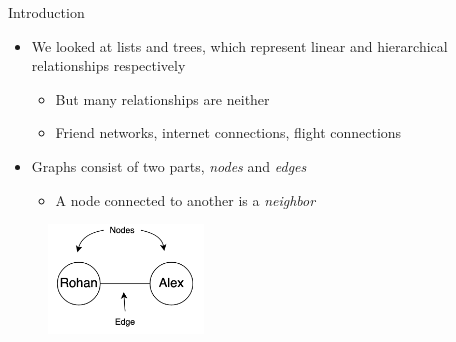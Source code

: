 \documentclass[
  ignorenonframetext,
]{beamer}
\providecommand{\tightlist}{%
  \setlength{\itemsep}{0pt}\setlength{\parskip}{0pt}}\usepackage{longtable,booktabs,array}
\begin{document}
\begin{frame}{Introduction}
\protect\hypertarget{introduction}{}
\begin{itemize}
\item
  We looked at lists and trees, which represent linear and hierarchical
  relationships respectively

  \begin{itemize}
  \item
    But many relationships are neither
  \item
    Friend networks, internet connections, flight connections
  \end{itemize}
\item
  Graphs consist of two parts, \emph{nodes} and \emph{edges}

  \begin{itemize}
  \tightlist
  \item
    A node connected to another is a \emph{neighbor} \vspace{1cm}
  \end{itemize}
\end{itemize}

\begin{figure}

{\centering \includegraphics[width=1.625in,height=\textheight]{images/graph-anat.png}

}

\end{figure}
\end{frame}
\end{document}
